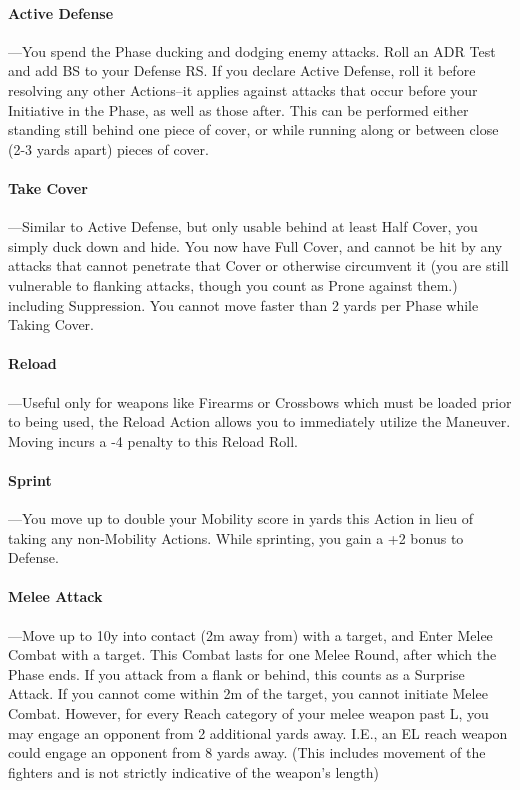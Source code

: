 \documentclass[oneside,11pt,english]{book}
\begin{document}
\paragraph{\label{par:Active Defense:} Active Defense}---\quad You spend the Phase ducking and dodging enemy attacks. Roll an ADR Test and add BS
to your Defense RS. If you declare Active Defense, roll it before resolving any other Actions--it applies
against attacks that occur before your Initiative in the Phase, as well as those after. This can be performed
either standing still behind one piece of cover, or while running along or between close (2-3 yards apart)
pieces of cover.

\paragraph{\label{par:Take Cover} Take Cover}---\quad Similar to Active Defense, but only usable behind at least Half Cover, you simply duck down and hide. You now have Full Cover, and cannot be hit by any attacks that cannot penetrate that
Cover or otherwise circumvent it (you are still vulnerable to flanking attacks, though you count as Prone
against them.) including Suppression. You cannot move faster than 2 yards per Phase while Taking
Cover.

\paragraph{\label{par:Reload}Reload}---\quad Useful only for weapons like Firearms or Crossbows which must be loaded prior to being used, the Reload Action allows you to immediately utilize the  Maneuver. Moving incurs a -4 penalty to this Reload Roll.

\paragraph{\label{par:Sprint} Sprint}---\quad You move up to double your Mobility score in yards this Action in lieu of taking any non-Mobility Actions. While sprinting, you gain a +2 bonus to Defense.

\paragraph{\label{par:Melee Attack} Melee Attack}---\quad Move up to 10y into contact (2m away from) with a target, and Enter Melee Combat with a target. This Combat lasts for one Melee Round, after which the Phase ends. If you attack from a flank or
behind, this counts as a Surprise Attack. If you cannot come within 2m of the target, you cannot initiate
Melee Combat. However, for every Reach category of your melee weapon past L, you may engage an
opponent from 2 additional yards away. I.E., an EL reach weapon could engage an opponent from 8 yards
away. (This includes movement of the fighters and is not strictly indicative of the weapon’s length)
\end{document}
